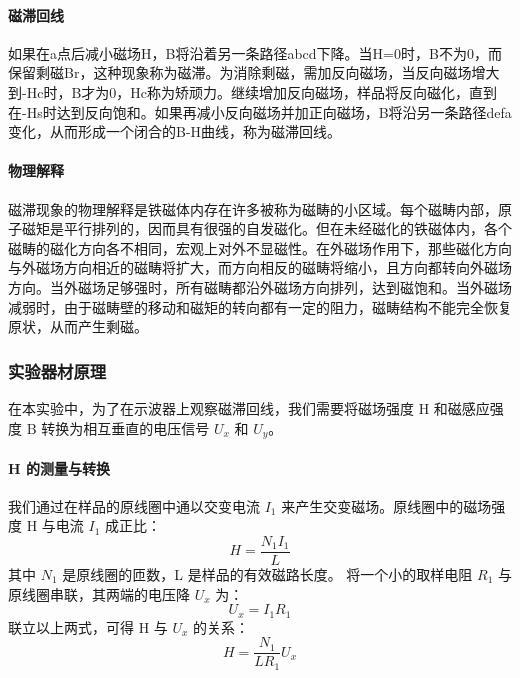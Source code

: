 \documentclass[]{../../templates/Report}%
\begin{document}
\paragraph{磁滞回线} 如果在a点后减小磁场H，B将沿着另一条路径abcd下降。当H=0时，B不为0，而保留剩磁Br，这种现象称为磁滞。为消除剩磁，需加反向磁场，当反向磁场增大到-Hc时，B才为0，Hc称为矫顽力。继续增加反向磁场，样品将反向磁化，直到在-Hs时达到反向饱和。如果再减小反向磁场并加正向磁场，B将沿另一条路径defa变化，从而形成一个闭合的B-H曲线，称为磁滞回线。

\paragraph{物理解释} 磁滞现象的物理解释是铁磁体内存在许多被称为磁畴的小区域。每个磁畴内部，原子磁矩是平行排列的，因而具有很强的自发磁化。但在未经磁化的铁磁体内，各个磁畴的磁化方向各不相同，宏观上对外不显磁性。在外磁场作用下，那些磁化方向与外磁场方向相近的磁畴将扩大，而方向相反的磁畴将缩小，且方向都转向外磁场方向。当外磁场足够强时，所有磁畴都沿外磁场方向排列，达到磁饱和。当外磁场减弱时，由于磁畴壁的移动和磁矩的转向都有一定的阻力，磁畴结构不能完全恢复原状，从而产生剩磁。

\subsubsection{实验器材原理}
在本实验中，为了在示波器上观察磁滞回线，我们需要将磁场强度 H 和磁感应强度 B 转换为相互垂直的电压信号 $U_x$ 和 $U_y$。

\paragraph{H 的测量与转换}
我们通过在样品的原线圈中通以交变电流 $I_1$ 来产生交变磁场。原线圈中的磁场强度 H 与电流 $I_1$ 成正比：
\begin{equation}
    H = \frac{N_1 I_1}{L}
\end{equation}
其中 $N_1$ 是原线圈的匝数，L 是样品的有效磁路长度。
将一个小的取样电阻 $R_1$ 与原线圈串联，其两端的电压降 $U_x$ 为：
\begin{equation}
    U_x = I_1 R_1
\end{equation}
联立以上两式，可得 H 与 $U_x$ 的关系：
\begin{equation}
    \boxed{H = \frac{N_1}{L R_1} U_x}
\end{equation}
\end{document}

